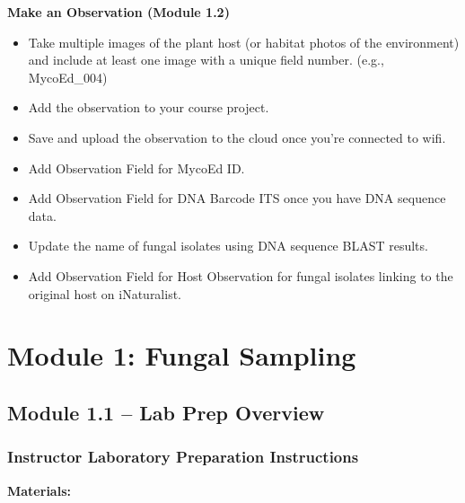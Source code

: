 \documentclass[
  letterpaper,
  DIV=11,
  numbers=noendperiod]{scrreprt}
\providecommand{\tightlist}{%
  \setlength{\itemsep}{0pt}\setlength{\parskip}{0pt}}
\begin{document}
\textbf{Make an Observation (Module 1.2)}

\begin{itemize}
\tightlist
\item[$\square$]
  Take multiple images of the plant host (or habitat photos of the
  environment) and include at least one image with a unique field
  number. (e.g., MycoEd\_004)
\item[$\square$]
  Add the observation to your course project.
\item[$\square$]
  Save and upload the observation to the cloud once you're connected to
  wifi.
\item[$\square$]
  Add Observation Field for MycoEd ID.
\item[$\square$]
  Add Observation Field for DNA Barcode ITS once you have DNA sequence
  data.
\item[$\square$]
  Update the name of fungal isolates using DNA sequence BLAST results.
\item[$\square$]
  Add Observation Field for Host Observation for fungal isolates linking
  to the original host on iNaturalist.
\end{itemize}


\chapter*{Module 1: Fungal Sampling}\label{module-1-fungal-sampling}


\section*{Module 1.1 -- Lab Prep
Overview}\label{module-1.1-lab-prep-overview}


\subsection*{Instructor Laboratory Preparation
Instructions}\label{instructor-laboratory-preparation-instructions}

\textbf{Materials:}
\end{document}
